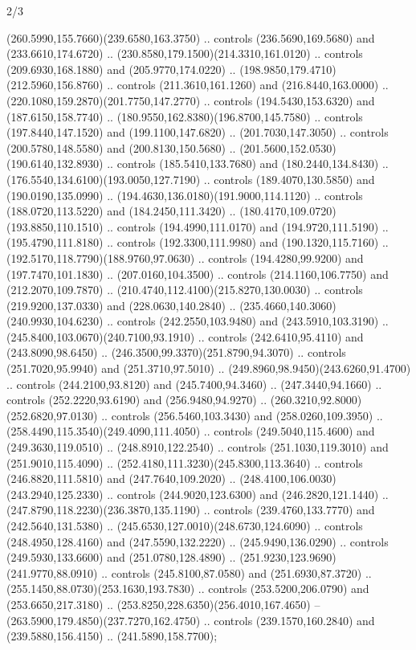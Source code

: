 \begin{flagdescription}{2/3}
\begin{scope}[shift={(0.5\flaglength,0.5)},scale=\flagwidth/320]
\begin{scope}[y=-0.8pt, x=0.8,shift={(-300,-200)}]
\begin{scope}[cm={{1.01189,0.0,0.0,1.01189,(47.01467,48.21687)}}]
  (260.5990,155.7660)(239.6580,163.3750) .. controls (236.5690,169.5680) and
  (233.6610,174.6720) .. (230.8580,179.1500)(214.3310,161.0120) .. controls
  (209.6930,168.1880) and (205.9770,174.0220) ..
  (198.9850,179.4710)(212.5960,156.8760) .. controls (211.3610,161.1260) and
  (216.8440,163.0000) .. (220.1080,159.2870)(201.7750,147.2770) .. controls
  (194.5430,153.6320) and (187.6150,158.7740) ..
  (180.9550,162.8380)(196.8700,145.7580) .. controls (197.8440,147.1520) and
  (199.1100,147.6820) .. (201.7030,147.3050) .. controls (200.5780,148.5580) and
  (200.8130,150.5680) .. (201.5600,152.0530)(190.6140,132.8930) .. controls
  (185.5410,133.7680) and (180.2440,134.8430) ..
  (176.5540,134.6100)(193.0050,127.7190) .. controls (189.4070,130.5850) and
  (190.0190,135.0990) .. (194.4630,136.0180)(191.9000,114.1120) .. controls
  (188.0720,113.5220) and (184.2450,111.3420) ..
  (180.4170,109.0720)(193.8850,110.1510) .. controls (194.4990,111.0170) and
  (194.9720,111.5190) .. (195.4790,111.8180) .. controls (192.3300,111.9980) and
  (190.1320,115.7160) .. (192.5170,118.7790)(188.9760,97.0630) .. controls
  (194.4280,99.9200) and (197.7470,101.1830) .. (207.0160,104.3500) .. controls
  (214.1160,106.7750) and (212.2070,109.7870) ..
  (210.4740,112.4100)(215.8270,130.0030) .. controls (219.9200,137.0330) and
  (228.0630,140.2840) .. (235.4660,140.3060)(240.9930,104.6230) .. controls
  (242.2550,103.9480) and (243.5910,103.3190) ..
  (245.8400,103.0670)(240.7100,93.1910) .. controls (242.6410,95.4110) and
  (243.8090,98.6450) .. (246.3500,99.3370)(251.8790,94.3070) .. controls
  (251.7020,95.9940) and (251.3710,97.5010) ..
  (249.8960,98.9450)(243.6260,91.4700) .. controls (244.2100,93.8120) and
  (245.7400,94.3460) .. (247.3440,94.1660) .. controls (252.2220,93.6190) and
  (256.9480,94.9270) .. (260.3210,92.8000)(252.6820,97.0130) .. controls
  (256.5460,103.3430) and (258.0260,109.3950) ..
  (258.4490,115.3540)(249.4090,111.4050) .. controls (249.5040,115.4600) and
  (249.3630,119.0510) .. (248.8910,122.2540) .. controls (251.1030,119.3010) and
  (251.9010,115.4090) .. (252.4180,111.3230)(245.8300,113.3640) .. controls
  (246.8820,111.5810) and (247.7640,109.2020) ..
  (248.4100,106.0030)(243.2940,125.2330) .. controls (244.9020,123.6300) and
  (246.2820,121.1440) .. (247.8790,118.2230)(236.3870,135.1190) .. controls
  (239.4760,133.7770) and (242.5640,131.5380) ..
  (245.6530,127.0010)(248.6730,124.6090) .. controls (248.4950,128.4160) and
  (247.5590,132.2220) .. (245.9490,136.0290) .. controls (249.5930,133.6600) and
  (251.0780,128.4890) .. (251.9230,123.9690)(241.9770,88.0910) .. controls
  (245.8100,87.0580) and (251.6930,87.3720) ..
  (255.1450,88.0730)(253.1630,193.7830) .. controls (253.5200,206.0790) and
  (253.6650,217.3180) .. (253.8250,228.6350)(256.4010,167.4650) --
  (263.5900,179.4850)(237.7270,162.4750) .. controls (239.1570,160.2840) and
  (239.5880,156.4150) .. (241.5890,158.7700);


\end{scope}
\end{scope}
\end{scope}
\end{flagdescription}
